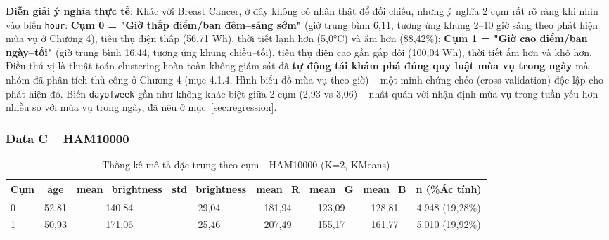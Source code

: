 \textbf{Diễn giải ý nghĩa thực tế}: Khác với Breast Cancer, ở đây không có nhãn thật để đối chiếu, nhưng ý nghĩa 2 cụm rất rõ ràng khi nhìn vào biến \texttt{hour}: \textbf{Cụm 0 = "Giờ thấp điểm/ban đêm--sáng sớm"} (giờ trung bình 6,11, tương ứng khung 2--10 giờ sáng theo phát hiện mùa vụ ở Chương 4), tiêu thụ điện thấp (56,71 Wh), thời tiết lạnh hơn (5,0°C) và ẩm hơn (88,42\%); \textbf{Cụm 1 = "Giờ cao điểm/ban ngày--tối"} (giờ trung bình 16,44, tương ứng khung chiều--tối), tiêu thụ điện cao gần gấp đôi (100,04 Wh), thời tiết ấm hơn và khô hơn. Điều thú vị là thuật toán clustering hoàn toàn không giám sát đã \textbf{tự động tái khám phá đúng quy luật mùa vụ trong ngày} mà nhóm đã phân tích thủ công ở Chương 4 (mục 4.1.4, Hình biểu đồ mùa vụ theo giờ) -- một minh chứng chéo (cross-validation) độc lập cho phát hiện đó. Biến \texttt{dayofweek} gần như không khác biệt giữa 2 cụm (2,93 vs 3,06) -- nhất quán với nhận định mùa vụ trong tuần yếu hơn nhiều so với mùa vụ trong ngày, đã nêu ở mục~\ref{sec:regression}.

\subsubsection{Data C -- HAM10000}

\begin{table}[H]
\centering
\caption{Thống kê mô tả đặc trưng theo cụm - HAM10000 (K=2, KMeans)}
\label{tab:cluster-profile-ham}
\begin{tabular}{lccccccc}
\toprule
\textbf{Cụm} & age & mean\_brightness & std\_brightness & mean\_R & mean\_G & mean\_B & n (\%Ác tính) \\
\midrule
0 & 52,81 & 140,84 & 29,04 & 181,94 & 123,09 & 128,81 & 4.948 (19,28\%) \\
1 & 50,93 & 171,06 & 25,46 & 207,49 & 155,17 & 161,77 & 5.010 (19,92\%) \\
\bottomrule
\end{tabular}
\end{table}

